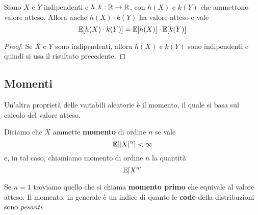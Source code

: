 \begin{corollary}
	Siano $X$ e $Y$ indipendenti e $h,k : \mathbb{R} \to \mathbb{R}$, con $h(X)$ e $k(Y)$ che ammettono valore
	atteso. Allora anche $h(X) \cdot k(Y)$ ha valore atteso e vale
	\[ \mathbb{E}[h(X) \cdot k(Y)] = \mathbb{E}[h(X)] \cdot \mathbb{E}[k(Y)] \]
	\begin{proof}
		Se $X$ e $Y$ sono indipendenti, allora $h(X)$ e $k(Y)$ sono indipendenti e quindi si usa
		il risultato precedente.
	\end{proof}
\end{corollary}

\subsection{Momenti}
Un'altra proprietà delle variabili aleatorie è il momento, il quale si basa sul calcolo del valore
atteso.

\begin{definition}
	Diciamo che $X$ ammette \textbf{momento} di ordine $n$ se vale
	\[ \mathbb{E}[|X|^n] < \infty \]
	e, in tal caso, chiamiamo momento di ordine $n$ la quantità
	\[ \mathbb{E}[X^n] \]
\end{definition}

Se $n=1$ troviamo quello che si chiama \textbf{momento primo} che equivale al valore atteso. Il
momento, in generale è un indice di quanto le \textbf{code} della distribuzioni sono \emph{pesanti}.

